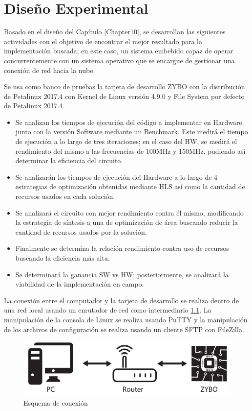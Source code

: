 
\chapter{Diseño Experimental} %
\label{Chapter11}

Basado en el diseño del Capítulo \ref{Chapter10}, se desarrollan las siguientes actividades con el objetivo de encontrar el mejor resultado para la implementación buscada; en este caso, un sistema embebido capaz de operar concurrentemente con un sistema operativo que se encargue de gestionar una conexión de red hacia la nube.

Se usa como banco de pruebas la tarjeta de desarrollo ZYBO con la distribución de Petalinux 2017.4 con Kernel de Linux versión 4.9.0 y File System por defecto de Petalinux 2017.4.
 
 \begin{itemize}
 
  \item Se analizan los tiempos de ejecución del código a implementar en Hardware junto con la versión Software mediante un Benchmark. Este medirá el tiempo de ejecución a lo largo de tres iteraciones; en el caso del HW, se medirá el rendimiento del mismo a las frecuencias de 100MHz y 150MHz, pudiendo así determinar la eficiencia del circuito.
 
 \item Se analizarán los tiempos de ejecución del Hardware a lo largo de 4 estrategias de optimización obtenidas mediante HLS así como la cantidad de recursos usados en cada solución.
 
 \item Se analizará el circuito con mejor rendimiento contra él mismo, modificando la estrategia de síntesis a una de optimización de área buscando reducir la cantidad de recursos usados por la solución.
 
 \item Finalmente se determina la relación rendimiento contra uso de recursos buscando la eficiencia más alta.
 
 \item Se determinará la ganancia SW vs HW; posteriormente, se analizará la viabilidad de la implementación en campo.
 
 \end{itemize}
 
La conexión entre el computador y la tarjeta de desarrollo se realiza dentro de una red local usando un enrutador de red como intermediario \ref{fig:router}. La manipulación de la consola de Linux se realiza usando PuTTY y la manipulación de los archivos de configuración se realiza usando un cliente SFTP con FileZilla. 

\begin{figure}[H]
	\centering
		\includegraphics[scale=1]{./Figures/router.pdf}
	\caption{Esquema de conexión}
	\label{fig:router}
\end{figure}
